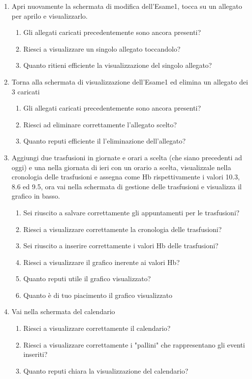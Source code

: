 \documentclass[12pt,a4paper,openright,twoside]{report}
\begin{document}
\begin{enumerate}
    \item Apri nuovamente la schermata di modifica dell'Esame1, tocca su un allegato per aprilo e visualizzarlo.
    \begin{enumerate}
        \item Gli allegati caricati precedentemente sono ancora presenti?
        \item Riesci a visualizzare un singolo allegato toccandolo?
        \item Quanto ritieni efficiente la visualizzazione del singolo allegato?
    \end{enumerate}
    
    \item Torna alla schermata di visualizzazione dell'Esame1 ed elimina un allegato dei 3 caricati
    \begin{enumerate}
        \item Gli allegati caricati precedentemente sono ancora presenti?
        \item Riesci ad eliminare correttamente l'allegato scelto?
        \item Quanto reputi efficiente il l'eliminazione dell'allegato?
    \end{enumerate}
    
    \item Aggiungi due trasfusioni in giornate e orari a scelta (che siano precedenti ad oggi) e una nella giornata di ieri con un orario a scelta, visualizzale nella cronologia delle trasfusioni e assegna come Hb rispettivamente i valori 10.3, 8.6 ed 9.5, ora vai nella schermata di gestione delle trasfusioni e visualizza il grafico in basso.
    \begin{enumerate}
        \item Sei riuscito a salvare correttamente gli appuntamenti per le trasfusioni?
        \item Riesci a visualizzare correttamente la cronologia delle trasfusioni?
        \item Sei riuscito a inserire correttamente i valori Hb delle trasfusioni?
        \item Riesci a visualizzare il grafico inerente ai valori Hb?
        \item Quanto reputi utile il grafico visualizzato?
        \item Quanto è di tuo piacimento il grafico visualizzato
    \end{enumerate}
    
    \item Vai nella schermata del calendario
    \begin{enumerate}
        \item Riesci a visualizzare correttamente il calendario?
        \item Riesci a visualizzare correttamente i "pallini" che rappresentano gli eventi inseriti?
        \item Quanto reputi chiara la visualizzazione del calendario?
    \end{enumerate}
    

\end{enumerate}
\end{document}
